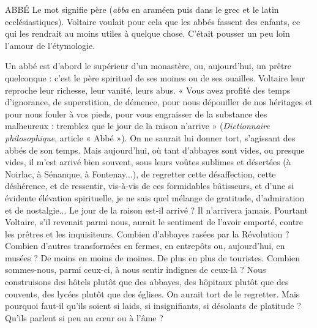 
ABBÉ Le mot signifie père ({\it abba} en araméen puis dans le grec et le latin
ecclésiastiques). Voltaire voulait pour cela que les abbés fassent des
enfants, ce qui les rendrait au moins utiles à quelque chose. C'était pousser
un peu loin l’amour de l’étymologie.

Un abbé est d’abord le supérieur d’un monastère, ou, aujourd’hui, un
prêtre quelconque : c’est le père spirituel de ses moines ou de ses ouailles. Voltaire
leur reproche leur richesse, leur vanité, leurs abus. « Vous avez profité des
temps d’ignorance, de superstition, de démence, pour nous dépouiller de nos
héritages et pour nous fouler à vos pieds, pour vous engraisser de la substance
des malheureux : tremblez que le jour de la raison n’arrive » ({\it Dictionnaire philosophique},
article « Abbé »). On ne saurait lui donner tort, s’agissant des abbés
de son temps. Mais aujourd’hui, où tant d’abbayes sont vides, ou presque vides,
il m'est arrivé bien souvent, sous leurs voûtes sublimes et désertées (à Noirlac,
à Sénanque, à Fontenay...), de regretter cette désaffection, cette déshérence, et
de ressentir, vis-à-vis de ces formidables bâtisseurs, et d’une si évidente élévation
spirituelle, je ne sais quel mélange de gratitude, d’admiration et de nostalgie...
Le jour de la raison est-il arrivé ? Il n’arrivera jamais. Pourtant Voltaire,
s’il revenait parmi nous, aurait le sentiment de l'avoir emporté, contre les
prêtres et les inquisiteurs. Combien d’abbayes rasées par la Révolution ? Combien
d’autres transformées en fermes, en entrepôts ou, aujourd’hui, en musées ?
De moins en moins de moines. De plus en plus de touristes. Combien
sommes-nous, parmi ceux-ci, à nous sentir indignes de ceux-là ? Nous construisons
des hôtels plutôt que des abbayes, des hôpitaux plutôt que des couvents,
des lycées plutôt que des églises. On aurait tort de le regretter. Mais
pourquoi faut-il qu’ils soient si laids, si insignifiants, si désolants de platitude ?
Qu'ils parlent si peu au cœur ou à l’âme ?

